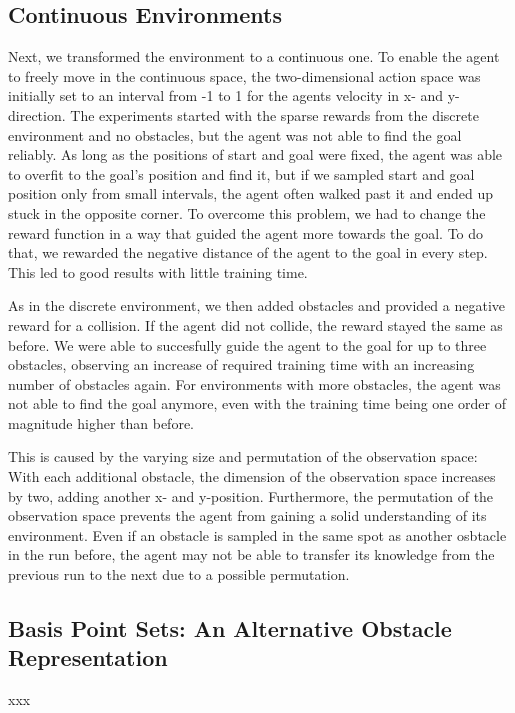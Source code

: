 \documentclass[conference]{IEEEtran}
\begin{document}
\subsection{Continuous Environments}

Next, we transformed the environment to a continuous one. To enable the agent to freely move in the continuous space, the two-dimensional action space was initially set to an interval from -1 to 1 for the agents velocity in x- and y- direction. The experiments started with the sparse rewards from the discrete environment and no obstacles, but the agent was not able to find the goal reliably. As long as the positions of start and goal were fixed, the agent was able to overfit to the goal's position and find it, but if we sampled start and goal position only from small intervals, the agent often walked past it and ended up stuck in the opposite corner. To overcome this problem, we had to change the reward function in a way that guided the agent more towards the goal. To do that, we rewarded the negative distance of the agent to the goal in every step. This led to good results with little training time.

As in the discrete environment, we then added obstacles and provided a negative reward for a collision. If the agent did not collide, the reward stayed the same as before. We were able to succesfully guide the agent to the goal for up to three obstacles, observing an increase of required training time with an increasing number of obstacles again. For environments with more obstacles, the agent was not able to find the goal anymore, even with the training time being one order of magnitude higher than before.

This is caused by the varying size and permutation of the observation space: With each additional obstacle, the dimension of the observation space increases by two, adding another x- and y-position. Furthermore, the permutation of the observation space prevents the agent from gaining a solid understanding of its environment. Even if an obstacle is sampled in the same spot as another osbtacle in the run before, the agent may not be able to transfer its knowledge from the previous run to the next due to a possible permutation.

\subsection{Basis Point Sets: An Alternative Obstacle Representation}

xxx
\end{document}

